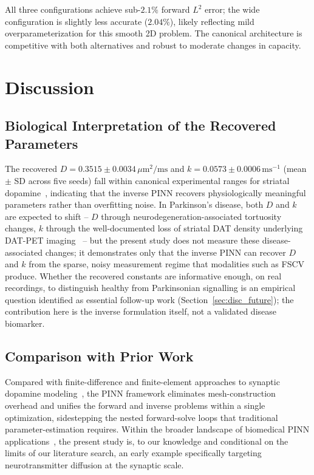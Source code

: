 \documentclass[12pt]{article}
\begin{document}
All three configurations achieve sub-$2.1\%$ forward $L^2$ error;
the wide configuration is slightly less accurate ($2.04\%$),
likely reflecting mild overparameterization for this smooth
2D problem. The canonical architecture is competitive with both
alternatives and robust to moderate changes in capacity.

\section{Discussion}
\label{sec:discussion}

\subsection{Biological Interpretation of the Recovered Parameters}
\label{sec:disc_bio}

The recovered $D = 0.3515 \pm 0.0034\,\mu\text{m}^2/\text{ms}$
and $k = 0.0573 \pm 0.0006\,\text{ms}^{-1}$ (mean $\pm$ SD
across five seeds) fall within canonical experimental ranges
for striatal dopamine~\cite{CraggRice2004, Nicholson1981,
Rice2008}, indicating that the inverse PINN recovers
physiologically meaningful parameters rather than overfitting
noise. In Parkinson's disease, both $D$ and $k$ are expected to
shift -- $D$ through neurodegeneration-associated tortuosity
changes, $k$ through the well-documented loss of striatal DAT
density underlying DAT-PET imaging~\cite{Rice2008,
CraggRice2004} -- but the present study does not measure these
disease-associated changes; it demonstrates only that the
inverse PINN can recover $D$ and $k$ from the sparse, noisy
measurement regime that modalities such as FSCV produce.
Whether the recovered constants are informative enough, on real
recordings, to distinguish healthy from Parkinsonian signalling
is an empirical question identified as essential follow-up work
(Section~\ref{sec:disc_future}); the contribution here is the
inverse formulation itself, not a validated disease biomarker.

\subsection{Comparison with Prior Work}
\label{sec:disc_priorwork}

Compared with finite-difference and finite-element approaches to
synaptic dopamine modeling~\cite{Wiencke2020}, the PINN
framework eliminates mesh-construction overhead and unifies the
forward and inverse problems within a single optimization,
sidestepping the nested forward-solve loops that traditional
parameter-estimation requires. Within the broader landscape of
biomedical PINN applications~\cite{Sahli2020, Yazdani2020,
Haghighat2021}, the present study is, to our knowledge and
conditional on the limits of our literature search, an early
example specifically targeting neurotransmitter diffusion at
the synaptic scale.
\end{document}
